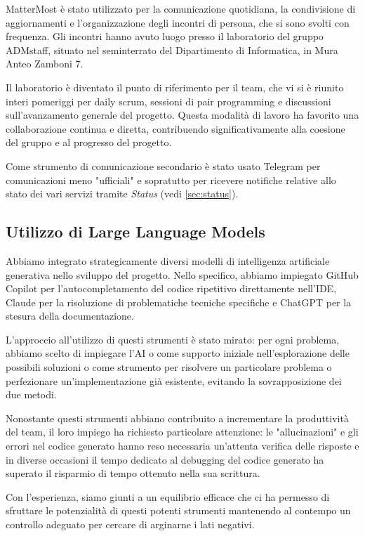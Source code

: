\documentclass{article}
\begin{document}
MatterMost è stato utilizzato per la comunicazione quotidiana, la condivisione di aggiornamenti e l'organizzazione degli incontri di persona, 
che si sono svolti con frequenza. Gli incontri hanno avuto luogo presso il laboratorio del gruppo ADMstaff, situato nel seminterrato del 
Dipartimento di Informatica, in Mura Anteo Zamboni 7.

Il laboratorio è diventato il punto di riferimento per il team, che vi si è riunito interi pomeriggi per daily scrum, sessioni di pair programming 
e discussioni sull'avanzamento generale del progetto. Questa modalità di lavoro ha favorito una collaborazione continua e diretta, contribuendo 
significativamente alla coesione del gruppo e al progresso del progetto.

Come strumento di comunicazione secondario è stato usato Telegram per comunicazioni meno "ufficiali" e sopratutto per ricevere notifiche relative 
allo stato dei vari servizi tramite \textit{Status} (vedi \ref{sec:status}).

\subsection{Utilizzo di Large Language Models}

Abbiamo integrato strategicamente diversi modelli di intelligenza artificiale generativa nello sviluppo del progetto. Nello specifico, abbiamo 
impiegato GitHub Copilot per l'autocompletamento del codice ripetitivo direttamente nell'IDE, Claude per la risoluzione di problematiche tecniche 
specifiche e ChatGPT per la stesura della documentazione.

L'approccio all'utilizzo di questi strumenti è stato mirato: per ogni problema, abbiamo scelto di impiegare l'AI o come supporto iniziale 
nell'esplorazione delle possibili soluzioni o come strumento per risolvere un particolare problema o perfezionare un'implementazione già esistente, 
evitando la sovrapposizione dei due metodi.

Nonostante questi strumenti abbiano contribuito a incrementare la produttività del team, il loro impiego ha richiesto particolare attenzione: le 
"allucinazioni" e gli errori nel codice generato hanno reso necessaria un'attenta verifica delle risposte e in diverse occasioni il tempo dedicato 
al debugging del codice generato ha superato il risparmio di tempo ottenuto nella sua scrittura.

Con l'esperienza, siamo giunti a un equilibrio efficace che ci ha permesso di sfruttare le potenzialità di questi potenti strumenti mantenendo al 
contempo un controllo adeguato per cercare di arginarne i lati negativi.
\end{document}
